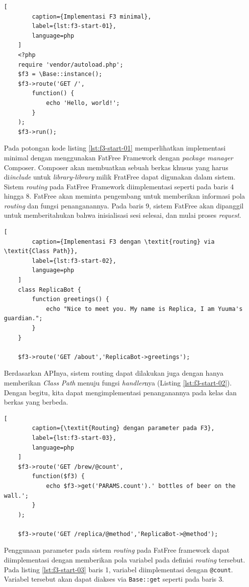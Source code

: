     \begin{lstlisting}[
        caption={Implementasi F3 minimal},
        label={lst:f3-start-01},
        language=php
    ]
    <?php
    require 'vendor/autoload.php';
    $f3 = \Base::instance();
    $f3->route('GET /',
        function() {
            echo 'Hello, world!';
        }
    );
    $f3->run();
    \end{lstlisting}
    
    Pada potongan kode listing \ref{lst:f3-start-01} memperlihatkan implementasi minimal dengan menggunakan FatFree Framework dengan \textit{package manager} Composer. Composer akan membuatkan sebuah berkas khusus yang harus di\textit{include} untuk \textit{library-library} milik FratFree dapat digunakan dalam sistem.
    Sistem \textit{routing} pada FatFree Framework diimplementasi seperti pada baris 4 hingga 8. FatFree akan meminta pengembang untuk memberikan informasi pola \textit{routing} dan fungsi penanganannya.
    Pada baris 9, sistem FatFree akan dipanggil untuk memberitahukan bahwa inisialisasi sesi selesai, dan mulai proses \textit{request}.
    
    \begin{lstlisting}[
        caption={Implementasi F3 dengan \textit{routing} via \textit{Class Path}},
        label={lst:f3-start-02},
        language=php
    ]
    class ReplicaBot {
        function greetings() {
            echo "Nice to meet you. My name is Replica, I am Yuuma's guardian.";
        }
    }
    
    $f3->route('GET /about','ReplicaBot->greetings');
    \end{lstlisting}
    Berdasarkan APInya, sistem routing dapat dilakukan juga dengan hanya memberikan \textit{Class Path} menuju fungsi \textit{handler}nya (Listing \ref{lst:f3-start-02}). Dengan begitu, kita dapat mengimplementasi penanganannya pada kelas dan berkas yang berbeda.
    
    \begin{lstlisting}[
        caption={\textit{Routing} dengan parameter pada F3},
        label={lst:f3-start-03},
        language=php
    ]
    $f3->route('GET /brew/@count',
        function($f3) {
            echo $f3->get('PARAMS.count').' bottles of beer on the wall.';
        }
    );
    
    $f3->route('GET /replica/@method','ReplicaBot->@method');
    \end{lstlisting}
    Penggunaan parameter pada sistem \textit{routing} pada FatFree framework dapat diimplementasi dengan memberikan pola variabel pada definisi \textit{routing} tersebut. Pada listing \ref{lst:f3-start-03} baris 1, variabel diimplementasi dengan \texttt{@count}. Variabel tersebut akan dapat diakses via \texttt{Base::get} seperti pada baris 3.
    
